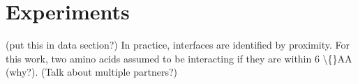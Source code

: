 \chapter{Experiments}
\label{chap:experiments}


(put this in data section?)
In practice, interfaces are identified by proximity. For this work, two amino acids assumed to be interacting if they are within 6 \textbackslash\{\}AA (why?). (Talk about multiple partners?)
